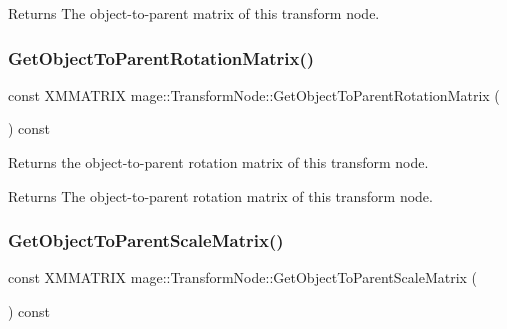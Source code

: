 \begin{DoxyReturn}{Returns}
The object-\/to-\/parent matrix of this transform node. 
\end{DoxyReturn}
\hypertarget{structmage_1_1_transform_node_a07d6171d757d2f7fbf0d2d59dbe531d9}{}\label{structmage_1_1_transform_node_a07d6171d757d2f7fbf0d2d59dbe531d9} 
\subsubsection{\texorpdfstring{Get\+Object\+To\+Parent\+Rotation\+Matrix()}{GetObjectToParentRotationMatrix()}}
{\footnotesize\ttfamily const X\+M\+M\+A\+T\+R\+IX mage\+::\+Transform\+Node\+::\+Get\+Object\+To\+Parent\+Rotation\+Matrix (\begin{DoxyParamCaption}{ }\end{DoxyParamCaption}) const\hspace{0.3cm}{\ttfamily [noexcept]}}

Returns the object-\/to-\/parent rotation matrix of this transform node.

\begin{DoxyReturn}{Returns}
The object-\/to-\/parent rotation matrix of this transform node. 
\end{DoxyReturn}
\hypertarget{structmage_1_1_transform_node_a0abee6b9b77888cd5ca44060256a33c7}{}\label{structmage_1_1_transform_node_a0abee6b9b77888cd5ca44060256a33c7} 
\subsubsection{\texorpdfstring{Get\+Object\+To\+Parent\+Scale\+Matrix()}{GetObjectToParentScaleMatrix()}}
{\footnotesize\ttfamily const X\+M\+M\+A\+T\+R\+IX mage\+::\+Transform\+Node\+::\+Get\+Object\+To\+Parent\+Scale\+Matrix (\begin{DoxyParamCaption}{ }\end{DoxyParamCaption}) const\hspace{0.3cm}{\ttfamily [noexcept]}}

